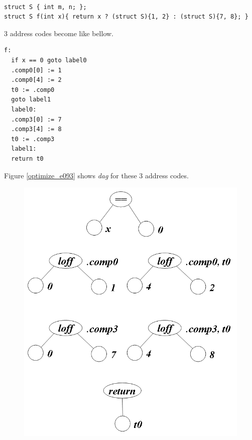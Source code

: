 \begin{Example}
\label{optimize_e092}
\begin{verbatim}

struct S { int m, n; };
struct S f(int x){ return x ? (struct S){1, 2} : (struct S){7, 8}; }
\end{verbatim}
3 address codes become like bellow.
\begin{verbatim}
f:
  if x == 0 goto label0
  .comp0[0] := 1
  .comp0[4] := 2
  t0 := .comp0
  goto label1
  label0:
  .comp3[0] := 7
  .comp3[4] := 8
  t0 := .comp3
  label1:
  return t0
\end{verbatim}
Figure \ref{optimize_e093} shows {\em dag} for these 3 address codes.
\begin{figure}[htbp]
\begin{center}
\begin{htmlonly}
\includegraphics[width=0.857\linewidth,height=1.0\linewidth]{opt040.png}
\end{htmlonly}
\begin{latexonly}

\end{latexonly}
\end{center}
\end{figure}
\end{Example}
